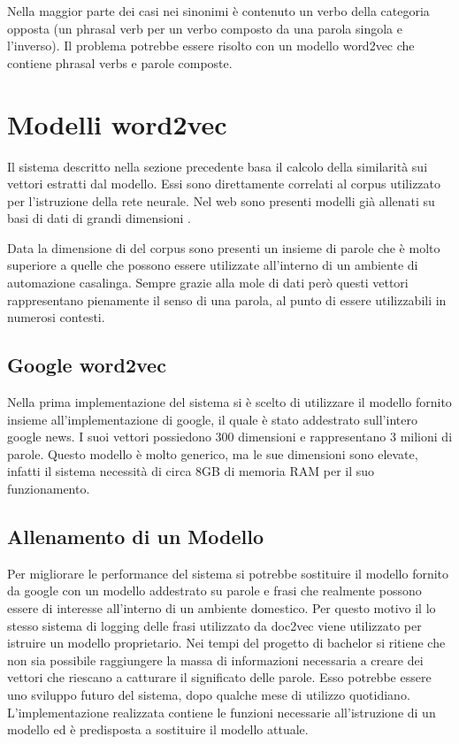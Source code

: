 \documentclass[twoside]{supsistudent}
\begin{document}
Nella maggior parte dei casi nei sinonimi è contenuto un verbo della categoria opposta (un phrasal verb per un verbo composto da una parola singola e l'inverso).
Il problema potrebbe essere risolto con un modello word2vec che contiene phrasal verbs e parole composte.
\chapter{Modelli word2vec}
Il sistema descritto nella sezione precedente basa il calcolo della similarità sui vettori estratti dal modello. Essi sono direttamente correlati al corpus \cite{corpus} utilizzato per l'istruzione della rete neurale. Nel web sono presenti modelli già allenati su basi di dati di grandi dimensioni \cite{trained_models}.

Data la dimensione di del corpus sono presenti un insieme di parole che è molto superiore a quelle che possono essere utilizzate all'interno di un ambiente di automazione casalinga. Sempre grazie alla mole di dati però questi vettori rappresentano pienamente il senso di una parola, al punto di essere utilizzabili in numerosi contesti.
\section{Google word2vec}
Nella prima implementazione del sistema si è scelto di utilizzare il modello fornito insieme all'implementazione di google, il quale è stato addestrato sull'intero google news. I suoi vettori possiedono 300 dimensioni e rappresentano 3 milioni di parole. Questo modello è molto generico, ma le sue dimensioni sono elevate, infatti il sistema necessità di circa 8GB di memoria RAM per il suo funzionamento.
\section{Allenamento di un Modello}
Per migliorare le performance del sistema si potrebbe sostituire il modello fornito da google con un modello addestrato su parole e frasi che realmente possono essere di interesse all'interno di un ambiente domestico. Per questo motivo il lo stesso sistema di logging delle frasi utilizzato da doc2vec viene utilizzato per istruire un modello proprietario. Nei tempi del progetto di bachelor si ritiene che non sia possibile raggiungere la massa di informazioni necessaria a creare dei vettori che riescano a catturare il significato delle parole. Esso potrebbe essere uno sviluppo futuro del sistema, dopo qualche mese di utilizzo quotidiano. L'implementazione realizzata contiene le funzioni necessarie all'istruzione di un modello ed è predisposta a sostituire il modello attuale.
\end{document}
